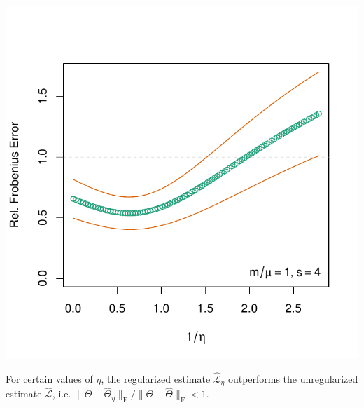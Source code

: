 \documentclass[xcolor=dvipsnames]{beamer}
\begin{document}
\begin{frame}
	\centering
	\includegraphics[scale=0.5]{plots/estimation-frob-p100}

	For certain values of $\eta$, the regularized estimate
	$\mathcal{\hat L}_\eta$ outperforms the unregularized
	estimate $\mathcal{\hat L}$, i.e.
	$\|\Theta - \hat \Theta_\eta\|_\mathrm{F}
	   / \|\Theta - \hat \Theta\|_\mathrm{F} < 1$.
\end{frame}
\end{document}
